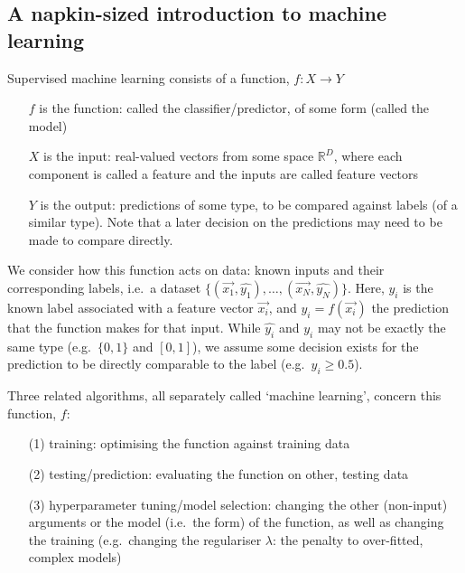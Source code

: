 \documentclass[12pt,a4paper]{article}
\begin{document}
\subsection{A napkin-sized introduction to machine learning}
\label{sec:napkin_intro_to_ml}
Supervised machine learning consists of a function, $f: X \rightarrow Y$
\begin{itemize}
    \item[$f$] is the function: called the classifier/predictor, of some form (called the model)
    \item[$X$] is the input: real-valued vectors from some space $\mathbb{R}^D$, where each component is called a feature and the inputs are called feature vectors
    \item[$Y$] is the output: predictions of some type, to be compared against labels (of a similar type). Note that a later decision on the predictions may need to be made to compare directly.
\end{itemize}
We consider how this function acts on data: known inputs and their corresponding labels, i.e.\ a dataset $\{(\vec{x_1},\hat{y_1}), \ldots, (\vec{x_N},\hat{y_N})\}$.
Here, $\hat{y_i}$ is the known label associated with a feature vector $\vec{x_i}$, and $y_i = f(\vec{x_i})$ the prediction that the function makes for that input. While $\hat{y_i}$ and $y_i$ may not be exactly the same type (e.g.\ $\{0,1\}$ and $[0,1]$), we assume some decision exists for the prediction to be directly comparable to the label (e.g.\ $y_i \geq 0.5$).%

\newpage
Three related algorithms, all separately called `machine learning', concern this function, $f$:
\begin{itemize}
    \item[(1)] training: optimising the function against training data
    \item[(2)] testing/prediction: evaluating the function on other, testing data
    \item[(3)] hyperparameter tuning/model selection: changing the other (non-input) arguments or the model (i.e.\ the form) of the function, as well as changing the training (e.g.\ changing the regulariser $\lambda$: the penalty to over-fitted, complex models)
\end{itemize}
\end{document}
